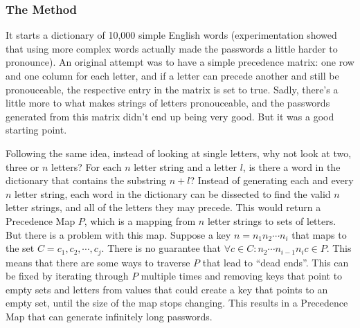\documentclass{article}
\begin{document}
\subsubsection{The Method}
\par It starts a dictionary of 10,000 simple English words (experimentation showed that using more complex words actually made the passwords a little harder to pronounce). An original attempt was to have a simple precedence matrix: one row and one column for each letter, and if a letter can precede another and still be pronouceable, the respective entry in the matrix is set to true. Sadly, there's a little more to what makes strings of letters pronouceable, and the passwords generated from this matrix didn't end up being very good. But it was a good starting point.
\par Following the same idea, instead of looking at single letters, why not look at two, three or $n$ letters? For each $n$ letter string and a letter $l$, is there a word in the dictionary that contains the substring $n + l$? Instead of generating each and every $n$ letter string, each word in the dictionary can be dissected to find the valid $n$ letter strings, and all of the letters they may precede. This would return a Precedence Map $P$, which is a mapping from $n$ letter strings to sets of letters. But there is a problem with this map. Suppose a key $n = n_1 n_2 \cdots n_i$ that maps to the set $C = {c_1, c_2, \cdots, c_j}$. There is no guarantee that $\forall c \in C: n_2 \cdots n_{i-1} n_i c \in P$. This means that there are some ways to traverse $P$ that lead to ``dead ends''. This can be fixed by iterating through $P$ multiple times and removing keys that point to empty sets and letters from values that could create a key that points to an empty set, until the size of the map stops changing. This results in a Precedence Map that can generate infinitely long passwords.
\end{document}
